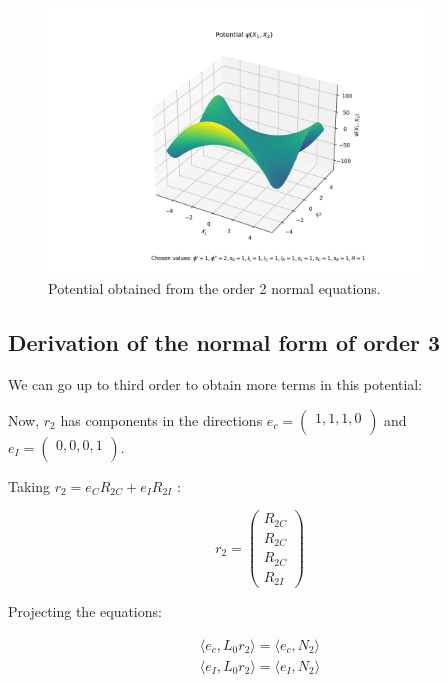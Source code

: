 \documentclass[ENG]{fancynotes}
\begin{document}
\begin{figure}[H]
\begin{center}
\includegraphics[width = 0.9\textwidth]{plots/potencial.png}
\caption{Potential obtained from the order 2 normal equations.}
\end{center}
\end{figure}

\subsection{Derivation of the normal form of order 3}

We can go up to third order to obtain more terms in this potential:

Now, $r_2$ has components in the directions $e_c = \begin{pmatrix}
1,1,1,0\\
\end{pmatrix}$ and $e_I = \begin{pmatrix}0,0,0,1\\\end{pmatrix}$. 

Taking $r_2 = e_CR_{2C} + e_IR_{2I}$ :

 \[
r_{2} = \begin{pmatrix}R_{2C}\\R_{2C}\\R_{2C}\\R_{2I} \end{pmatrix} 
\]


Projecting the equations:

\begin{equation}
\begin{aligned}
\langle e_c , L_0r_2 \rangle = \langle e_c, N_2\rangle\\[8pt]
\langle e_I , L_0r_2 \rangle = \langle e_I, N_2\rangle
\end{aligned}
\label{eq:secondorder}
\end{equation}
\end{document}
